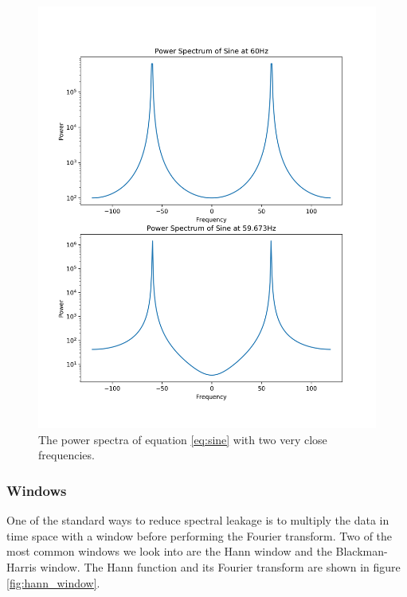 \message{ !name(austin_report.tex)}\documentclass[11pt, letterpage]{article}
\begin{document}
\begin{figure}
  \includegraphics[width=\linewidth]{power_spectrum.png}
  \caption{
    The power spectra of equation \ref{eq:sine} with two very close frequencies.
  }
  \label{}
\end{figure}

\subsubsection{Windows}
One of the standard ways to reduce spectral leakage is to multiply the data in
time space with a window before performing the Fourier transform. Two of the
most common windows we look into are the Hann window and the Blackman-Harris
window. The Hann function and its Fourier transform are shown in figure
\ref{fig:hann_window}.
\end{document}
